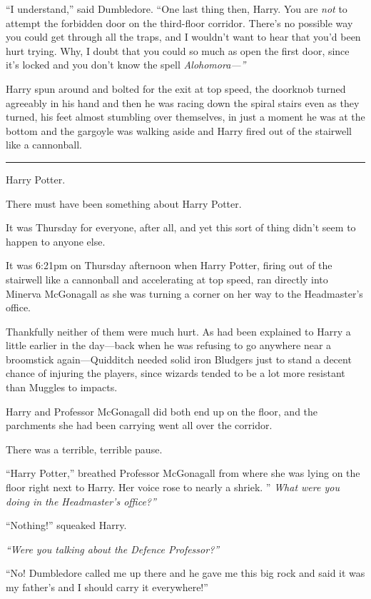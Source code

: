 ``I understand,'' said Dumbledore. ``One last thing then, Harry. You are
\emph{not} to attempt the forbidden door on the third-floor corridor.
There's no possible way you could get through all the traps, and I
wouldn't want to hear that you'd been hurt trying. Why, I doubt that you
could so much as open the first door, since it's locked and you don't
know the spell \emph{Alohomora---''}

Harry spun around and bolted for the exit at top speed, the doorknob
turned agreeably in his hand and then he was racing down the spiral
stairs even as they turned, his feet almost stumbling over themselves,
in just a moment he was at the bottom and the gargoyle was walking aside
and Harry fired out of the stairwell like a cannonball.

\begin{center}\rule{3in}{0.4pt}\end{center}

Harry Potter.

There must have been something about Harry Potter.

It was Thursday for everyone, after all, and yet this sort of thing
didn't seem to happen to anyone else.

It was 6:21pm on Thursday afternoon when Harry Potter, firing out of the
stairwell like a cannonball and accelerating at top speed, ran directly
into Minerva McGonagall as she was turning a corner on her way to the
Headmaster's office.

Thankfully neither of them were much hurt. As had been explained to
Harry a little earlier in the day---back when he was refusing to go
anywhere near a broomstick again---Quidditch needed solid iron Bludgers
just to stand a decent chance of injuring the players, since wizards
tended to be a lot more resistant than Muggles to impacts.

Harry and Professor McGonagall did both end up on the floor, and the
parchments she had been carrying went all over the corridor.

There was a terrible, terrible pause.

``Harry Potter,'' breathed Professor McGonagall from where she was lying
on the floor right next to Harry. Her voice rose to nearly a shriek. ''
\emph{What were you doing in the Headmaster's office?''}

``Nothing!'' squeaked Harry.

\emph{``Were you talking about the Defence Professor?''}

``No! Dumbledore called me up there and he gave me this big rock and
said it was my father's and I should carry it everywhere!''

